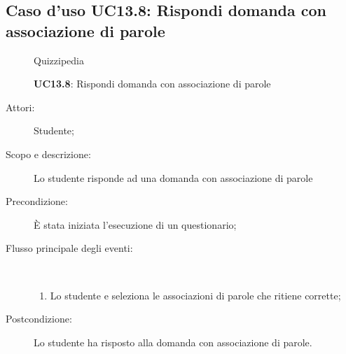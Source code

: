\subsection{Caso d'uso UC13.8: Rispondi domanda con associazione di parole}
	\begin{figure}[H]
		\centering
		\begin{resizedtikzpicture}{\textwidth}
		\begin{umlsystem}[x=0, fill=lightgray!20]{Quizzipedia}
		\end{umlsystem}
		\end{resizedtikzpicture}
		\caption{\textbf{UC13.8}: Rispondi domanda con associazione di parole}
		\label{UC13.8}
	\end{figure}
\begin{description}
\item[Attori:] Studente;
\item[Scopo e descrizione:] Lo studente risponde ad una domanda con associazione di parole
      \item[Precondizione:] È stata iniziata l'esecuzione di un questionario;

        \item[Flusso principale degli eventi:] \ 
 \begin{enumerate}
          \item Lo studente e seleziona le associazioni di parole che ritiene corrette;

      \end{enumerate}
    \item[Postcondizione:] Lo studente ha risposto alla domanda con associazione di parole.
  \end{description}
\hypertarget{UC13.9}{}
